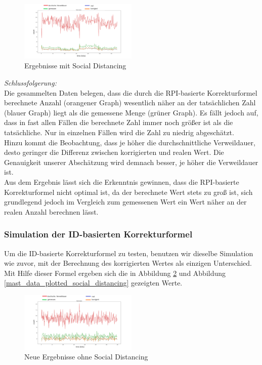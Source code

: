 \documentclass[conference,compsoc]{IEEEtran}
\begin{document}
\begin{figure}[h]
	\centering
	\includegraphics[width=0.5\textwidth]{"Mast_Data_Plotted_Social_Distancing_old"}
	\caption{Ergebnisse mit Social Distancing}
	\label{mast_data_plotted_social_distancing_old}
\end{figure}
\textit{Schlussfolgerung:}\\
Die gesammelten Daten belegen, dass die durch die RPI-basierte Korrekturformel berechnete Anzahl (orangener Graph) wesentlich näher an der tatsächlichen Zahl (blauer Graph) liegt als die gemessene Menge (grüner Graph). Es fällt jedoch auf, dass in fast allen Fällen die berechnete Zahl immer noch größer ist als die tatsächliche. Nur in einzelnen Fällen wird die Zahl zu niedrig abgeschätzt.\\
Hinzu kommt die Beobachtung, dass je höher die durchschnittliche Verweildauer, desto geringer die Differenz zwischen korrigierten und realen Wert. Die Genauigkeit unserer Abschätzung wird demnach besser, je höher die Verweildauer ist.\\

Aus dem Ergebnis lässt sich die Erkenntnis gewinnen, dass die RPI-basierte Korrekturformel nicht optimal ist, da der berechnete Wert stets zu groß ist, sich grundlegend jedoch im Vergleich zum gemessenen Wert ein Wert näher an der realen Anzahl berechnen lässt.

\subsubsection{Simulation der ID-basierten Korrekturformel}
Um die ID-basierte Korrekturformel zu testen, benutzen wir dieselbe Simulation wie zuvor, mit der Berechnung des korrigierten Wertes als einzigen Unterschied.\\
Mit Hilfe dieser Formel ergeben sich die in Abbildung \ref{mast_data_plotted} und Abbildung \ref{mast_data_plotted_social_distancing} gezeigten Werte.

\begin{figure}[h]
	\centering
	\includegraphics[width=0.5\textwidth]{"Mast_Data_Plotted"}
	\caption{Neue Ergebnisse ohne Social Distancing}
	\label{mast_data_plotted}
\end{figure}
\end{document}
